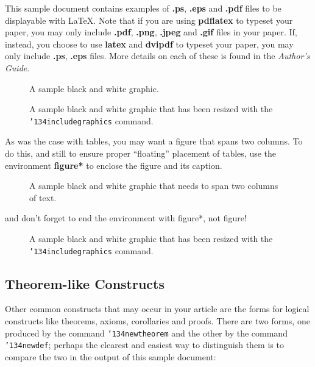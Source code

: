 \documentclass{aamas2012}
\begin{document}
This sample document contains examples of \textbf{.ps}, \textbf{.eps} and \textbf{.pdf} files to be displayable with \LaTeX. Note that if you are using \textbf{pdflatex} to typeset your paper, you may only include \textbf{.pdf}, \textbf{.png}, \textbf{.jpeg} and \textbf{.gif} files in your paper. If, instead, you choose to use \textbf{latex} and \textbf{dvipdf} to typeset your paper, you may only include \textbf{.ps}, \textbf{.eps} files. More details on each of these is found in the \textit{Author's Guide}.

\begin{figure}
\centering
\caption{A sample black and white graphic.}
\end{figure}

\begin{figure}
\centering
\caption{A sample black and white graphic that has been resized with the \texttt{{\char'134}includegraphics} command.}
\end{figure}


As was the case with tables, you may want a figure
that spans two columns.  To do this, and still to
ensure proper ``floating'' placement of tables, use the environment
\textbf{figure*} to enclose the figure and its caption.
\begin{figure*}
\centering
\caption{A sample black and white graphic
that needs to span two columns of text.}
\end{figure*}
and don't forget to end the environment with
{figure*}, not {figure}!


\begin{figure}
\centering
\caption{A sample black and white graphic that has
been resized with the \texttt{{\char'134}includegraphics} command.}
\end{figure}

\subsection{Theorem-like Constructs}
Other common constructs that may occur in your article are
the forms for logical constructs like theorems, axioms,
corollaries and proofs.  There are
two forms, one produced by the
command \texttt{{\char'134}newtheorem} and the
other by the command \texttt{{\char'134}newdef}; perhaps
the clearest and easiest way to distinguish them is
to compare the two in the output of this sample document:
\end{document}

